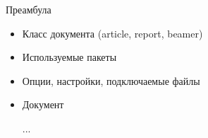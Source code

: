 \begin{frame}[fragile]{Преамбула}
  \begin{itemize}
    \item Класс документа (article, report, beamer)
    \pause
    \item Используемые пакеты 
      \begin{latexcode}
        \usepackage{mathtools}
        \usepackage{minted}
        \usepackage[utf8x]{inputenc}
        \usepackage[russian]{babel}
      \end{latexcode}
    \pause
    \item Опции, настройки, подключаемые файлы
      \begin{latexcode}
        
      \end{latexcode}
    \pause
    \item Документ
      \begin{latexcode}
        
          ...
        
      \end{latexcode}
  \end{itemize}
\end{frame}

